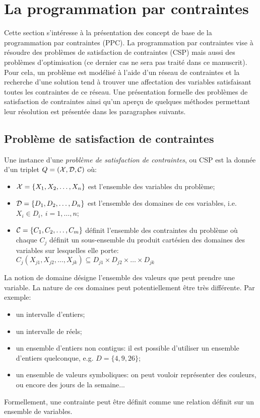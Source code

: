 \section{La programmation par contraintes}

Cette section s'intéresse à la présentation des concept de base de la
programmation par contraintes (PPC). La programmation par contraintes
vise à résoudre des problèmes de satisfaction de contraintes (CSP)
mais aussi des problèmes d'optimisation (ce dernier cas ne sera pas
traité dans ce manuscrit). Pour cela, un problème est
modélisé à l'aide d'un réseau de contraintes et la recherche d'une
solution tend à trouver une affectation des variables satisfaisant
toutes les contraintes de ce réseau. Une présentation formelle des
problèmes de satisfaction de contraintes ainsi qu'un aperçu de
quelques méthodes permettant leur résolution est présentée dans les
paragraphes suivants. 

\subsection{Problème de satisfaction de contraintes}

Une instance d'une {\it problème de satisfaction de contraintes}, ou CSP est
la donnée d'un triplet $Q=({\cal X},{\cal D},{\cal C})$ où: 
\begin{itemize}
\item ${\cal X}=\{X_1,X_2,\dots,X_n\}$ est l'ensemble des variables du problème;
\item ${\cal D}=\{D_1,D_2,\dots,D_n\}$ est l'ensemble des domaines de ces
  variables, i.e. $X_i \in D_i,\ i=1,\dots,n$;
\item ${\cal C}=\{C_1,C_2,\dots,C_m\}$ définit l'ensemble des contraintes du
  problème où chaque $C_j$ définit un sous-ensemble du produit
  cartésien des domaines des variables sur lesquelles elle porte:
  $C_j(X_{j1},X_{j2},\dots,X_{jk}) \subseteq D_{j1} \times D_{j2}
  \times \dots \times D_{jk}$
\end{itemize}

La notion de domaine désigne l'ensemble des valeurs que peut prendre
une variable. La nature de ces domaines peut potentiellement être très
différente. Par exemple:
\begin{itemize}
\item un intervalle d'entiers;
\item un intervalle de réels;
\item un ensemble d'entiers non contigus: il est possible d'utiliser
  un ensemble d'entiers quelconque, e.g. $D=\{4,9,26\}$;
\item un ensemble de valeurs symboliques: on peut vouloir représenter
  des couleurs, ou encore des jours de la semaine... 
\end{itemize}
Formellement, une contrainte peut être définit comme une relation
définit sur un ensemble de variables. 

